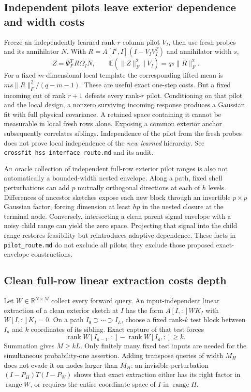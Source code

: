 \documentclass[11pt,oneside,openany,a4paper]{book}
\numberwithin{equation}{chapter}
\theoremstyle{definition}
\theoremstyle{remark}
\newcommand{\sourcefile}[1]{{\small\nolinkurl{#1}}}
\begin{document}
\subsection{Independent pilots leave exterior dependence and width costs}

Freeze an independently learned rank-$r$ column pilot $V_I$, then use
fresh probes and its annihilator $N$.  With
$R=A[I^c,I](I-V_IV_I^T)$ and annihilator width $s$,
\[
 Z=\Psi_{I^c}^TR\Omega_I N,\qquad
 \mathbb E(\|Z\|_F^2\mid V_I)=qs\|R\|_F^2.
\]
For a fixed $m$-dimensional local template the corresponding lifted
mean is $ms\|R\|_F^2/(q-m-1)$.  These are useful exact one-step costs.
But a fixed incoming cut of rank $r+1$ defeats every rank-$r$ pilot.
Conditioning on that pilot and the local design, a nonzero surviving
incoming response produces a Gaussian fit with full physical covariance.
A retained space containing it cannot be measurable in local fresh
rows alone.  Exposing a common exterior anchor subsequently correlates
siblings.  Independence of the pilot from the fresh probes does not
prove local independence of the \emph{new learned} hierarchy.
See \sourcefile{crossfit_hss_interface_route.md} and its audit.

An oracle collection of independent full-row exterior pilot ranges is
also not automatically a bounded-width nested envelope.  Along a path,
fixed shell perturbations can add $p$ mutually orthogonal directions
at each of $h$ levels.  Differences of ancestor sketches expose each
new block through an invertible $p\times p$ Gaussian factor, forcing
dimension at least $hp$ in the nested closure at the terminal node.
Conversely, intersecting a clean parent signal envelope with a noisy
child range can yield the zero space.  Projecting that signal into the
child range restores feasibility but reintroduces adaptive dependence.
These facts in \sourcefile{pilot_route.md} do not exclude all pilots;
they exclude those proposed exact-envelope constructions.

\subsection{Clean full-row linear extraction costs depth}

Let $W\in\mathbb R^{N\times M}$ collect every forward query.  An
input-independent linear extraction of a clean exterior sketch at $I$
has the form $A[I,:]WK_I$ with $W[I,:]K_I=0$.  On a path
$I_0\supset\cdots\supset I_L$, choose a fixed rank-$k$ test block
between $I_d$ and $k$ coordinates of its sibling.  Exact capture of
that test forces
\[
 \operatorname{rank}W[I_{d-1},:]
  -\operatorname{rank}W[I_d,:]\ge k.
\]
Summation gives $M\ge kL$.  Only finitely many fixed test inputs are
needed for the simultaneous probability-one assertion.  Adding
transpose queries of width $M_H$ does not evade it on nodes larger
than $M_H$: an invisible perturbation
$(I-P_H)T(I-P_W)$ shows that exact extraction either has its right
factor in $\operatorname{range}W$, or requires the entire coordinate
space of $I$ in $\operatorname{range}H$.
\end{document}
